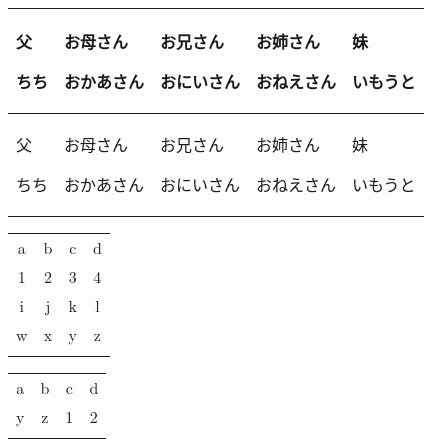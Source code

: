 \documentclass[12pt,a4j, landscape, dvipdfmx]{utarticle}
\def\cell(#1,#2){\rule{0pt}{3ex} \hspace*{-.4cm} {\LARGE #1} \newline \rule{0pt}{4ex} \hspace*{1cm} {\small #2}}
\begin{document}
\newcommand\T{\rule{0pt}{2.6ex}} 


\begin{tabular}{|p{3.5cm} | p{3.5cm} | p{3.5cm} |  p{3.5cm} |  p{3.5cm} |}
\hhline{|t:==:t:==:t|} 
 \cell(父,ちち) & \cell(お母さん,おかあさん) & \cell(お兄さん,おにいさん) & \cell(お姉さん,おねえさん) & \cell(妹,いもうと) \tabularnewline \hline
 \cell(父,ちち) & \cell(お母さん,おかあさん) & \cell(お兄さん,おにいさん) & \cell(お姉さん,おねえさん) & \cell(妹,いもうと) \tabularnewline \hline


\end{tabular} 

\begin{tabular}{||cc||c|c||}
\hhline{|t:==:t:==:t|}
a&b&c&d\\
\hhline{|:==:|~|~||}
1&2&3&4\\
\hhline{#==#~|=#}
i&j&k&l\\
\hhline{||--||--||}
w&x&y&z\\
\hhline{|b:==:b:==:b|}
\end{tabular}

\begin{tabular}{||cc||cc||}
\hhline{|t:==:t|t:==:t|}
a&b&c&d\\
\hhline{||--||--||}
y&z&1&2\\
\hhline{|b:==:b:==:b|}
\end{tabular}
\end{document}

